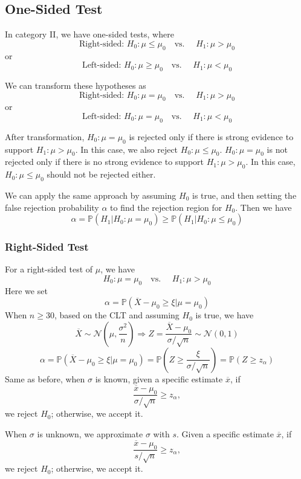 \subsection{One-Sided Test}
In category II, we have one-sided tests, where
\[
  \text{Right-sided: } H_0: \mu \leq \mu_0 \quad \text{vs. } \quad H_1: \mu > \mu_0
\]
or
\[
  \text{Left-sided: } H_0: \mu \geq \mu_0 \quad \text{vs. } \quad H_1: \mu < \mu_0
\]

We can transform these hypotheses as  
\[
  \text{Right-sided: } H_0: \mu = \mu_0 \quad \text{vs. } \quad H_1: \mu > \mu_0
\]
or
\[
  \text{Left-sided: } H_0: \mu = \mu_0 \quad \text{vs. } \quad H_1: \mu < \mu_0
\]

After transformation, \(H_0: \mu = \mu_0\) is rejected only if there is strong evidence to support \(H_1: \mu > \mu_0\). In this case, we also reject \(H_0: \mu \leq \mu_0\).  
\(H_0: \mu = \mu_0\) is not rejected only if there is no strong evidence to support \(H_1: \mu > \mu_0\). In this case, \(H_0: \mu \leq \mu_0\) should not be rejected either.

We can apply the same approach by assuming \(H_0\) is true, and then setting the false rejection probability \(\alpha\) to find the rejection region for \(H_0\). Then we have 
\[
  \alpha = \mathbb{P}(H_1 \vert H_0: \mu = \mu_0) \geq \mathbb{P}(H_1 \vert H_0: \mu \leq \mu_0)
\]

\subsubsection{Right-Sided Test}
For a right-sided test of \(\mu\), we have 
\[
  H_0: \mu = \mu_0 \quad \text{vs. } \quad H_1: \mu > \mu_0
\]
Here we set
\[
  \alpha = \mathbb{P} (\overline{X} - \mu_0 \geq \xi \vert \mu = \mu_0)
\]
When \(n \geq 30\), based on the CLT and assuming \(H_0\) is true, we have 
\[
  \overline{X} \sim \mathcal{N} \left(\mu, \frac{\sigma^2}{n}\right) \Longrightarrow Z = \frac{\overline{X} - \mu_0}{\sigma / \sqrt{n}} \sim \mathcal{N} (0, 1)
\]
\[
  \alpha = \mathbb{P} \left(\overline{X} - \mu_0 \geq \xi \vert \mu = \mu_0 \right) = \mathbb{P} \left(Z \geq \frac{\xi}{\sigma / \sqrt{n}} \right) = \mathbb{P} \left(Z \geq z_{\alpha} \right)
\]
Same as before, when \(\sigma\) is known, given a specific estimate \(\overline{x}\), if 
\[
  \frac{\overline{x} - \mu_0}{\sigma / \sqrt{n}} \geq z_{\alpha}, 
\]
we reject \(H_0\); otherwise, we accept it.

When \(\sigma\) is unknown, we approximate \(\sigma\) with \(s\). Given a specific estimate \(\overline{x}\), if 
\[
  \frac{\overline{x} - \mu_0}{s / \sqrt{n}} \geq z_{\alpha},
\]
we reject \(H_0\); otherwise, we accept it.

